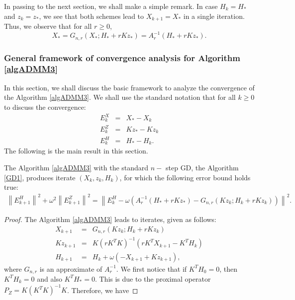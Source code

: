 \begin{itemize}
In passing to the next section, we shall make a simple remark. In case $H_k = H_*$ and $z_k = z_*$, we see that both schemes lead to $X_{k+1} = X_*$ in a single iteration. Thus, we observe that for all $r \geq 0$, 
\begin{equation}
X_* = G_{n,r}(X_*; H_* +r Kz_*) = A_r^{-1}(H_* + rKz_*).  
\end{equation} 

\subsubsection{General framework of convergence analysis for Algorithm \ref{algADMM3}}

In this section, we shall discuss the basic framework to analyze the convergence of the Algorithm \ref{algADMM3}. We shall use the standard notation that for all $k \geq 0$ to discuss the convergence:  
\begin{eqnarray*}
E_k^X &=& X_* - X_k \\
E_k^Z &=& Kz_* - Kz_k \\ 
E_k^H &=& H_* - H_k. 
\end{eqnarray*}
The following is the main result in this section. 
\begin{theorem}\label{main:theorem0} 
The Algorithm \ref{algADMM3} with the standard $n-$ step GD, the Algorithm \ref{GD1}, produces iterate $(X_k, z_k, H_k)$, for which the following error bound holds true: 
\begin{eqnarray*}
\left \|E_{k+1}^H \right \|^2 + \omega^2 \left \|E_{k+1}^Z \right \|^2 = \left \|E_k^H - \omega (A_r^{-1} (H_* + r K z_*) - G_{n,r} (Kz_k; H_k + r K z_k)) \right \|^2. 
\end{eqnarray*}
\end{theorem}
\begin{proof} 
The Algorithm \ref{algADMM3} leads to iterates, given as follows: 
\begin{eqnarray*}
X_{k+1} &=& G_{n,r} (Kz_k;H_k + r K z_k) \\
Kz_{k+1} &=& K(rK^TK)^{-1} (rK^T X_{k+1} - K^TH_k) \\ 
H_{k+1} &=& H_k + \omega (-X_{k+1} + Kz_{k+1} ), 
\end{eqnarray*}
where $G_{n,r}$ is an approximate of $A_r^{-1}$. We first notice that if $K^TH_0 = 0$, then $K^TH_k = 0$ and also $K^TH_* = 0$. This is due to the proximal operator $P_Z = K(K^TK)^{-1}K$. Therefore, we have 

\end{proof}
\end{itemize}
